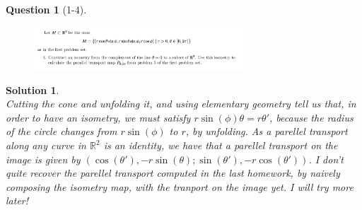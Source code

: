 \documentclass[11pt]{article}
\theoremstyle{plain}
\theoremstyle{quest}
\newtheorem*{question}{Question}
\newtheorem*{solution}{Solution}
\begin{document}
\begin{question}[1-4]
\hfill
\begin{figure}[h!]
  \centering
    \includegraphics[width=0.7\textwidth]{geoII-s2-p4.png}
\end{figure}
\end{question}
\begin{solution} \hfill \\
Cutting the cone and unfolding it, and using elementary geometry tell us that,
in order to have an isometry, we must satisfy $r\sin(\phi)\theta = r\theta'$,
because the radius of the circle changes from $r\sin(\phi)$ to $r$, by unfolding.
As a parellel transport along any curve in $\mathbb{R}^2$ is an identity, we have 
that a parellel transport on the image is given by $(\cos(\theta'),-r\sin(\theta);
\sin(\theta'), -r\cos(\theta'))$. I don't quite recover the parellel transport computed 
in the last homework, by naively composing the isometry map, with the tranport
on the image yet. I will try more later!  
 
\end{solution}
\end{document}
